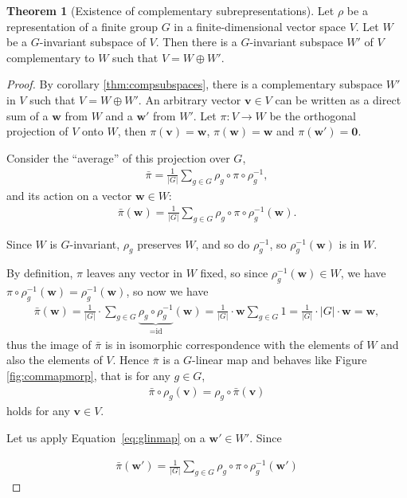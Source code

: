 \documentclass[12pt, a4paper, twoside]{article}
\theoremstyle{definition}
\newtheorem{theorem}[definition]{Theorem}
\theoremstyle{remark}
\numberwithin{equation}{section}
\newcommand{\1}{\mathbf{1}}
\newcommand{\0}{\mathbf{0}}
\newcommand{\id}{\text{id}}
\newcommand{\vvec}{\mathbf{v}}
\newcommand{\wvec}{\mathbf{w}}
\begin{document}
	\begin{theorem}[Existence of complementary subrepresentations]
		Let $\rho$ be a representation of a finite group $G$ in a finite-dimensional vector space $V$. Let $W$ be a $G$-invariant subspace of $V$. Then there is a  $G$-invariant subspace $W'$ of $V$ complementary to $W$ such that $V = W \oplus W'$.
	\end{theorem}
	\begin{proof}
		By corollary \ref{thm:compsubspaces}, there is a complementary subspace $W'$ in $V$ such that $V = W \oplus W'$. An arbitrary vector $\vvec \in V$ can be written as a direct sum of a $\wvec$ from $W$ and a $\wvec'$ from $W'$. Let $\pi: V \rightarrow W$ be the orthogonal projection of $V$ onto $W$, then $\pi(\vvec) = \wvec$, $\pi(\wvec) = \wvec$ and $\pi(\wvec') = \0$. 
		
		Consider the ``average'' of this projection over $G$, 
		\begin{align*}
			\bar{\pi} = \frac{1}{|G|} \sum_{g \in G} \rho_g \circ \pi \circ \rho_g^{-1},
		\end{align*}
		and its action on a vector $\wvec \in W$:
		\begin{align*}
			\bar{\pi}(\wvec) = \frac{1}{|G|} \sum_{g \in G} \rho_g \circ \pi \circ \rho_g^{-1} (\wvec).
		\end{align*}
		
		
		
		Since $W$ is $G$-invariant, $\rho_g$ preserves $W$, and so do $\rho_{g}^{-1}$, so $\rho_g^{-1}(\wvec)$ is in $W$. 
		
		By definition, $\pi$ leaves any vector in $W$ fixed, so since $\rho_g^{-1}(\wvec) \in W$, we have $\pi \circ \rho_g^{-1}(\wvec) = \rho_g^{-1}(\wvec)$, so now we have 
		\begin{align*}
			\bar{\pi}(\wvec) = \frac{1}{|G|} \cdot\sum_{g \in G} \underset{=\id}{\underbrace{\rho_g \circ \rho_g^{-1}}} (\wvec)
			= \frac{1}{|G|} \cdot \wvec \sum_{g \in G} 1 = \frac{1}{|G|}\cdot  |G| \cdot \wvec = \wvec,
		\end{align*}
		thus the image of $\bar{\pi}$ is in isomorphic correspondence with the elements of $W$ and also the elements of $V$. Hence $\bar{\pi}$ is a $G$-linear map and behaves like Figure \ref{fig:commapmorp}, that is for any $g \in G$,		\begin{align}\label{eq:glinmap}
			\bar{\pi} \circ \rho_g (\vvec) = \rho_g \circ \bar{\pi} (\vvec)
		\end{align}
		holds for any $\vvec \in V$.
		
		Let us apply Equation~\ref{eq:glinmap} on a $\wvec' \in W'$. Since \
		
		\begin{align*}
			\bar{\pi}(\wvec') = \frac{1}{|G|} \sum_{g \in G} \rho_g \circ \pi \circ \rho_g^{-1}(\wvec')
		\end{align*}
	\end{proof}
	
\end{document}
